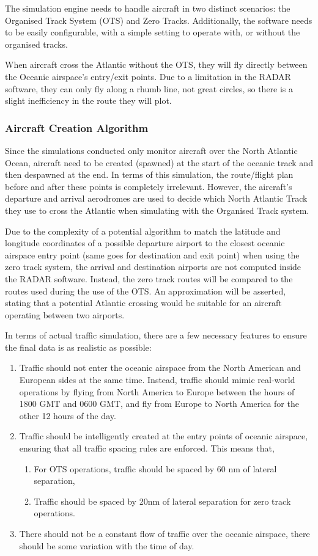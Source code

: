 \documentclass[stu, a4paper, 12pt, floatsintext]{apa7}
\numberwithin{figure}{section}
\numberwithin{table}{section}
\numberwithin{equation}{section}
\begin{document}
The simulation engine needs to handle aircraft in two distinct scenarios: the Organised Track System (OTS) and Zero Tracks. Additionally, the software needs to be easily configurable, with a simple setting to operate with, or without the organised tracks.

When aircraft cross the Atlantic without the OTS, they will fly directly between the Oceanic airspace’s entry/exit points. Due to a limitation in the RADAR software, they can only fly along a rhumb line, not great circles, so there is a slight inefficiency in the route they will plot.  

\subsubsection{Aircraft Creation Algorithm}
Since the simulations conducted only monitor aircraft over the North Atlantic Ocean, aircraft need to be created (spawned) at the start of the oceanic track and then despawned at the end. In terms of this simulation, the route/flight plan before and after these points is completely irrelevant. However, the aircraft’s departure and arrival aerodromes are used to decide which North Atlantic Track they use to cross the Atlantic when simulating with the Organised Track system.

Due to the complexity of a potential algorithm to match the latitude and longitude coordinates of a possible departure airport to the closest oceanic airspace entry point (same goes for destination and exit point) when using the zero track system, the arrival and destination airports are not computed inside the RADAR software. Instead, the zero track routes will be compared to the routes used during the use of the OTS. An approximation will be asserted, stating that a potential Atlantic crossing would be suitable for an aircraft operating between two airports.

In terms of actual traffic simulation, there are a few necessary features to ensure the final data is as realistic as possible:
\begin{enumerate}
    \item Traffic should not enter the oceanic airspace from the North American and European sides at the same time. Instead, traffic should mimic real-world operations by flying from North America to Europe between the hours of 1800 GMT and 0600 GMT, and fly from Europe to North America for the other 12 hours of the day. 
    \item Traffic should be intelligently created at the entry points of oceanic airspace, ensuring that all traffic spacing rules are enforced. This means that,
    \begin{enumerate}
        \item For OTS operations, traffic should be spaced by 60 nm of lateral separation,
        \item Traffic should be spaced by 20nm of lateral separation for zero track operations.
    \end{enumerate}
    \item There should not be a constant flow of traffic over the oceanic airspace, there should be some variation with the time of day.
\end{enumerate}
\end{document}
